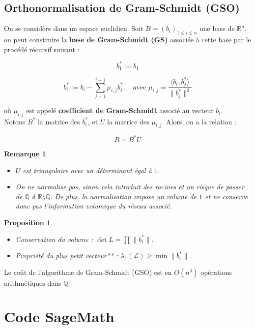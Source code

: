 \documentclass[a4paper,12pt]{report}  %
\theoremstyle{definitionstyle}
\theoremstyle{examplestyle}
\theoremstyle{remarkstyle}
\newtheorem{remark}{Remarque}[chapter] %
\theoremstyle{propositionstyle}
\newtheorem{proposition}{Proposition}[chapter]  %
\theoremstyle{theoremstyle}
\begin{document}
	
	\section{Orthonormalisation de Gram-Schmidt (GSO)}
	
	On se considère dans un espace euclidien. Soit \( B = (b_i)_{1 \leq i \leq n} \) une base de \( \mathbb{R}^n \), on peut construire la \textbf{base de Gram-Schmidt (GS)} associée à cette base par le procédé récursif suivant :
	
	
	$$b_1^* := b_1$$
	
	
	$$b_i^* := b_i - \sum_{j=1}^{i-1} \mu_{i,j} b_j^*, \quad \text{avec } \mu_{i,j} = \frac{\langle b_i, b_j^* \rangle}{\| b_j^* \|^2}$$
	
	où \( \mu_{i,j} \) est appelé \textbf{coefficient de Gram-Schmidt} associé au vecteur \( b_i \). \\
	
	Notons \( B^* \) la matrice des \( b_i^* \), et \( U \) la matrice des \( \mu_{i,j} \). Alors, on a la relation :
	
	$$B = B^* U$$
	
	 \begin{remark}
	 	\begin{itemize}
	 		\item  $U$ est triangulaire avec un déterminant égal à $1$.
	 		\item On ne normalise pas, sinon cela introduit des racines et on risque de passer de \( \mathbb{Q} \) à \( \mathbb{R} \setminus \mathbb{Q} \). De plus, la normalisation impose un volume de $1$ et ne conserve donc pas l'information volumique du réseau associé.
	 	\end{itemize}
 	\end{remark}
	
	
	\begin{proposition}
		\begin{itemize}
			\item Conservation du volume : \( \det L = \prod \| b_i^* \| \).
			\item Propriété du plus petit vecteur** : \( \lambda_1(\mathcal{L}) \geq \min \| b_i^* \| \).
		\end{itemize}
	\end{proposition}	
	
	Le coût de l'algorithme de Gram-Schmidt (GSO) est en \( O(n^3) \) opérations arithmétiques dans \( \mathbb{Q} \).
	
	\chapter{Code SageMath}

	
	\printbibliography
	
\end{document}

